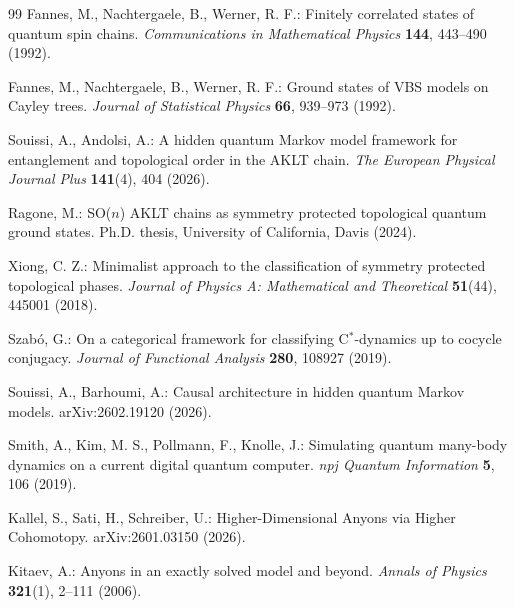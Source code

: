 \documentclass[12pt,a4paper]{article}
\begin{document}
\begin{thebibliography}{99}
Fannes, M., Nachtergaele, B., Werner, R. F.:
Finitely correlated states of quantum spin chains.
\textit{Communications in Mathematical Physics} \textbf{144}, 443–490 (1992).

Fannes, M., Nachtergaele, B., Werner, R. F.:
Ground states of VBS models on Cayley trees.
\textit{Journal of Statistical Physics} \textbf{66}, 939–973 (1992).

Souissi, A., Andolsi, A.:
A hidden quantum Markov model framework for entanglement and topological order in the AKLT chain.
\textit{The European Physical Journal Plus} \textbf{141}(4), 404 (2026).

Ragone, M.:
SO($n$) AKLT chains as symmetry protected topological quantum ground states.
Ph.D. thesis, University of California, Davis (2024).

Xiong, C. Z.:
Minimalist approach to the classification of symmetry protected topological phases.
\textit{Journal of Physics A: Mathematical and Theoretical} \textbf{51}(44), 445001 (2018).

Szabó, G.:
On a categorical framework for classifying C$^*$-dynamics up to cocycle conjugacy.
\textit{Journal of Functional Analysis} \textbf{280}, 108927 (2019).

Souissi, A., Barhoumi, A.:
Causal architecture in hidden quantum Markov models.
arXiv:2602.19120 (2026).


Smith, A., Kim, M. S., Pollmann, F., Knolle, J.:
Simulating quantum many-body dynamics on a current digital quantum computer.
\textit{npj Quantum Information} \textbf{5}, 106 (2019).

Kallel, S., Sati, H., Schreiber, U.:
Higher-Dimensional Anyons via Higher Cohomotopy.
arXiv:2601.03150 (2026).

Kitaev, A.:
Anyons in an exactly solved model and beyond.
\textit{Annals of Physics} \textbf{321}(1), 2–111 (2006).

\end{thebibliography}
\end{document}
